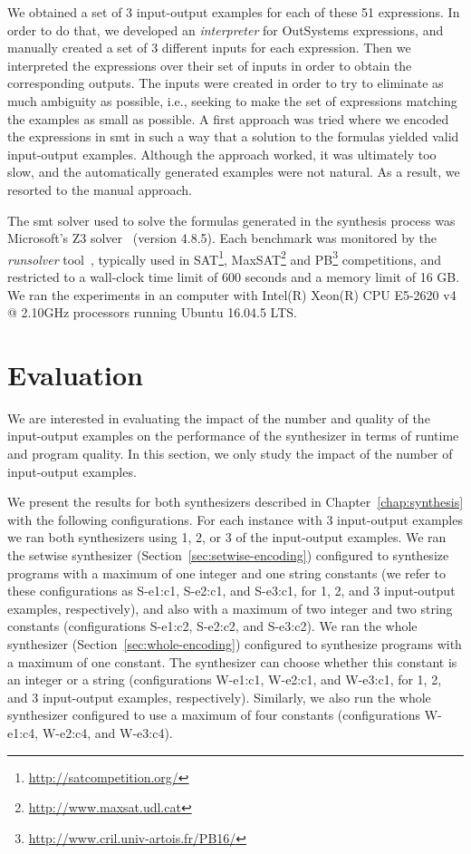 We obtained a set of 3 input-output examples for each of these 51 expressions.
In order to do that, we developed an \textit{interpreter} for OutSystems
expressions, and manually created a set of 3 different inputs for each
expression.
Then we interpreted the expressions over their set of inputs in order to
obtain the corresponding outputs.
The inputs were created in order to try to eliminate as much ambiguity as
possible, i.e., seeking to make the set of expressions matching the examples as
small as possible.
A first approach was tried where we encoded the expressions in \gls{smt} in such
a way that a solution to the formulas yielded valid input-output examples.
Although the approach worked, it was ultimately too slow, and the automatically
generated examples were not natural.
As a result, we resorted to the manual approach.

The \gls{smt} solver used to solve the formulas generated in the synthesis
process was Microsoft's Z3 solver~\cite{DeMoura:2008:ZES} (version 4.8.5).
Each benchmark was monitored by the \textit{runsolver}
tool~\cite{Roussel:2011:JSAT}, typically used in
SAT\footnote{\url{http://satcompetition.org/}},
MaxSAT\footnote{\url{http://www.maxsat.udl.cat}} and
PB\footnote{\url{http://www.cril.univ-artois.fr/PB16/}}
competitions, and restricted to a wall-clock time limit of 600 seconds and a
memory limit of 16 GB.
We ran the experiments in an computer with Intel(R) Xeon(R) CPU E5-2620 v4 @
2.10GHz processors running Ubuntu 16.04.5 LTS.

\section{Evaluation}
\label{sec:results}

We are interested in evaluating the impact of the number and quality of the
input-output examples on the performance of the synthesizer in terms of runtime
and program quality.
In this section, we only study the impact of the number of input-output
examples.

We present the results for both synthesizers described in
Chapter~\ref{chap:synthesis} with the following configurations.
For each instance with 3 input-output examples we ran both synthesizers using 1,
2, or 3 of the input-output examples.
We ran the setwise synthesizer (Section~\ref{sec:setwise-encoding}) configured
to synthesize programs with a maximum of one integer and one string constants
(we refer to these configurations as S-e1:c1, S-e2:c1, and S-e3:c1, for 1, 2,
and 3 input-output examples, respectively), and also with a maximum of two
integer and two string constants (configurations S-e1:c2, S-e2:c2, and S-e3:c2).
We ran the whole synthesizer (Section~\ref{sec:whole-encoding}) configured to
synthesize programs with a maximum of one constant. The synthesizer can
choose whether this constant is an integer or a string (configurations W-e1:c1,
W-e2:c1, and W-e3:c1, for 1, 2, and 3 input-output examples, respectively).
Similarly, we also run the whole synthesizer configured to use a maximum of four
constants (configurations W-e1:c4, W-e2:c4, and W-e3:c4).

